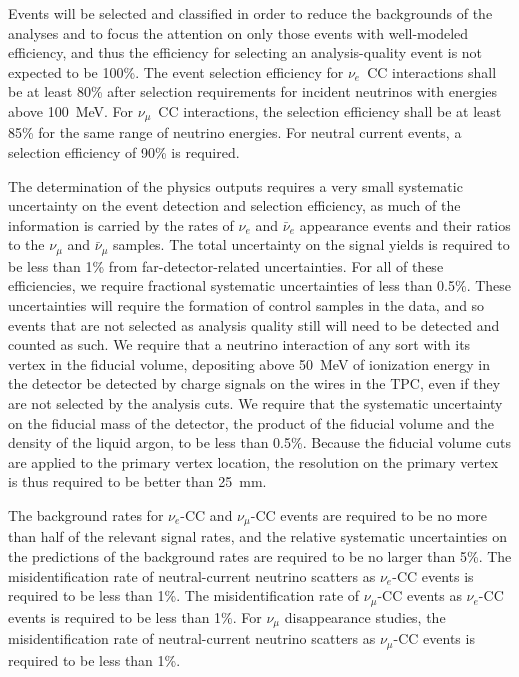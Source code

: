 
Events will be selected and classified in order to reduce the
backgrounds of the analyses and to focus the attention on only those
events with well-modeled efficiency, and thus the efficiency for
selecting an analysis-quality event is not expected to be 100\%.  The
event selection efficiency for $\nu_e$~CC interactions shall be at
least 80\% after selection requirements for incident neutrinos with
energies above 100~MeV.  For $\nu_\mu$~CC interactions, the selection
efficiency shall be at least 85\% for the same range of neutrino
energies.  For neutral current events, a selection efficiency of 90\%
is required.

The determination of the physics outputs requires a very small
systematic uncertainty on the event detection and selection
efficiency, as much of the information is carried by the rates of
$\nu_e$ and $\bar\nu_e$ appearance events and their ratios to the
$\nu_\mu$ and $\bar\nu_\mu$ samples.  The total uncertainty on the
signal yields is required to be less than 1\% from
far-detector-related uncertainties.  For all of these efficiencies, we
require fractional systematic uncertainties of less than 0.5\%.  These
uncertainties will require the formation of control samples in the
data, and so events that are not selected as analysis quality still will
need to be detected and counted as such.  We require that a neutrino
interaction of any sort with its vertex in the fiducial volume,
depositing above 50~MeV of ionization energy in the detector be
detected by charge signals on the wires in the TPC, even if they are
not selected by the analysis cuts.  We require that the systematic
uncertainty on the fiducial mass of the detector, the product of the
fiducial volume and the density of the liquid argon, to be less than
0.5\%.  Because the fiducial volume cuts are applied to the primary
vertex location, the resolution on the primary vertex is thus required
to be better than 25~mm.

The background rates for $\nu_e$-CC and $\nu_\mu$-CC events are required
to be no more than half of the relevant signal rates, and the relative
systematic uncertainties on the predictions of the background rates 
are required to be no larger than 5\%.  The misidentification
rate of neutral-current neutrino scatters as $\nu_e$-CC events is
required to be less than 1\%.  The misidentification rate of
$\nu_\mu$-CC events as $\nu_e$-CC events is required to be less than
1\%.  For $\nu_\mu$ disappearance studies, the misidentification rate
of neutral-current neutrino scatters as $\nu_\mu$-CC events is
required to be less than 1\%.

